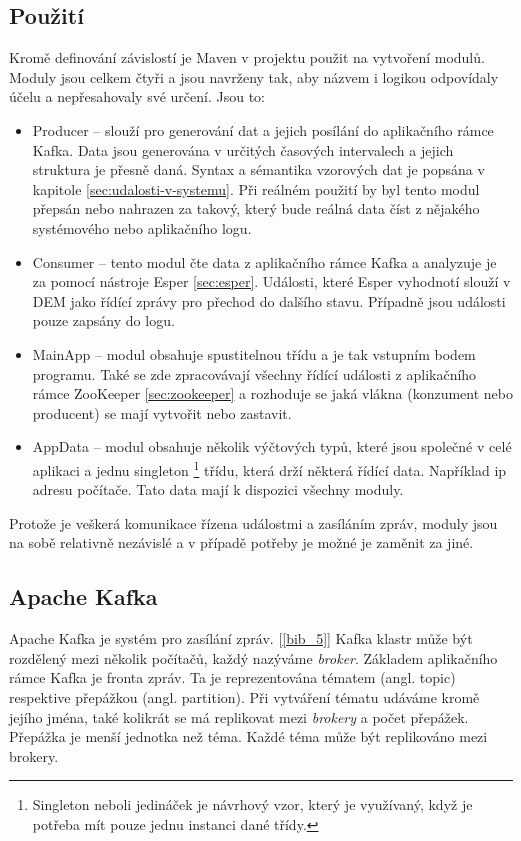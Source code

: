 \documentclass[
  digital, %
  table,   %
  nolof,     %
  nolot,     %
  oneside, %
  nocover,
  monochrome,
  12pt
]{fithesis3}
\begin{document}
\subsection*{Použití}
\label{sec:maven-usage}
Kromě definování závislostí je Maven v projektu použit na vytvoření modulů. Moduly jsou celkem čtyři a jsou navrženy tak, aby názvem i logikou odpovídaly účelu a nepřesahovaly své určení. Jsou to:
\begin{itemize}
  \item Producer -- slouží pro generování dat a jejich posílání do aplikačního rámce Kafka. Data jsou generována v určitých časových intervalech a jejich struktura je přesně daná. Syntax a sémantika vzorových dat je popsána v kapitole \ref{sec:udalosti-v-systemu}. Při reálném použití by byl tento modul přepsán nebo nahrazen za takový, který bude reálná data číst z nějakého systémového nebo aplikačního logu.
  \item Consumer -- tento modul čte data z aplikačního rámce Kafka a analyzuje je za pomocí nástroje Esper \ref{sec:esper}. Události, které Esper vyhodnotí slouží v DEM jako řídící zprávy pro přechod do dalšího stavu. Případně jsou události pouze zapsány do logu.
  \item MainApp -- modul obsahuje spustitelnou třídu a je tak vstupním bodem programu. Také se zde zpracovávají všechny řídící události z aplikačního rámce ZooKeeper \ref{sec:zookeeper} a rozhoduje se jaká vlákna (konzument nebo producent) se mají vytvořit nebo zastavit.
  \item AppData -- modul obsahuje několik výčtových typů, které jsou společné v celé aplikaci a jednu singleton \footnote{Singleton neboli jedináček je návrhový vzor, který je využívaný, když je potřeba mít pouze jednu instanci dané třídy.} třídu, která drží některá řídící data. Například ip adresu počítače. Tato data mají k dispozici všechny moduly.
\end{itemize}
Protože je veškerá komunikace řízena událostmi a zasíláním zpráv, moduly jsou na sobě relativně nezávislé a v případě potřeby je možné je zaměnit za jiné. 

\subsection{Apache Kafka}
\label{sec:kafka}
Apache Kafka je systém pro zasílání zpráv. [\ref{bib_5}] Kafka klastr může být rozdělený mezi několik počítačů, každý nazýváme \textit{broker}. Základem aplikačního rámce Kafka je fronta zpráv. Ta je reprezentována tématem (angl. topic) respektive přepážkou (angl. partition). Při vytváření tématu udáváme kromě jejího jména, také kolikrát se má replikovat mezi \textit{brokery} a počet přepážek. Přepážka je menší jednotka než téma. Každé téma může být replikováno mezi brokery.
\end{document}
